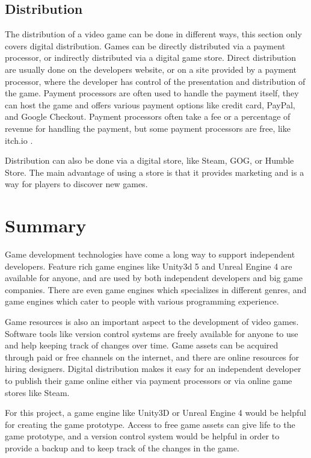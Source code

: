 \subsection{Distribution}
The distribution of a video game can be done in different ways, this section only covers digital distribution. Games can be directly distributed via a payment processor, or indirectly distributed via a digital game store. Direct distribution are usually done on the developers website, or on a site provided by a payment processor, where the developer has control of the presentation and distribution of the game. Payment processors are often used to handle the payment itself, they can host the game and offers various payment options like credit card, PayPal, and Google Checkout. Payment processors often take a fee or a percentage of revenue for handling the payment, but some payment processors are free, like itch.io \cite{itchio2016payment}.

Distribution can also be done via a digital store, like Steam, GOG, or Humble Store. The main advantage of using a store is that it provides marketing and is a way for players to discover new games.

\section{Summary}
Game development technologies have come a long way to support independent developers. Feature rich game engines like Unity3d 5 and Unreal Engine 4 are available for anyone, and are used by both independent developers and big game companies. There are even game engines which specializes in different genres, and game engines which cater to people with various programming experience.

Game resources is also an important aspect to the development of video games. Software tools like version control systems are freely available for anyone to use and help keeping track of changes over time. Game assets can be acquired through paid or free channels on the internet, and there are online resources for hiring designers. Digital distribution makes it easy for an independent developer to publish their game online either via payment processors or via online game stores like Steam.

For this project, a game engine like Unity3D or Unreal Engine 4 would be helpful for creating the game prototype. Access to free game assets can give life to the game prototype, and a version control system would be helpful in order to provide a backup and to keep track of the changes in the game.